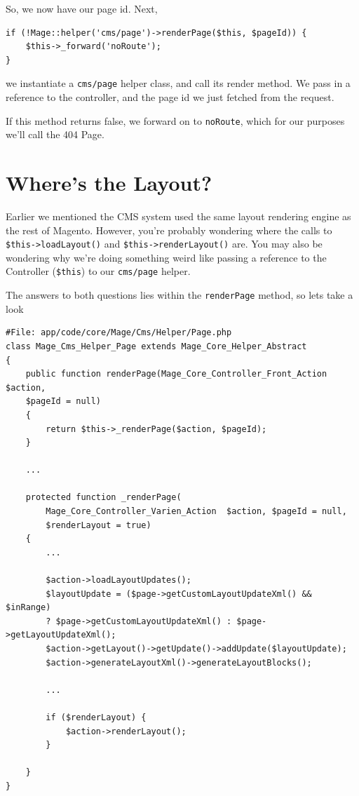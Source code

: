 \documentclass[oneside]{book}
\begin{document}
So, we now have our page id.  Next,

\begin{lstlisting}
if (!Mage::helper('cms/page')->renderPage($this, $pageId)) {
    $this->_forward('noRoute');
}

\end{lstlisting}


we instantiate a \footnotesize\texttt{cms/page} \normalsize  helper class, and call its render method.  We pass in a reference to the controller, and the page id we just fetched from the request.

If this method returns false, we forward on to \footnotesize\texttt{noRoute}\normalsize, which for our purposes we'll call the 404 Page.

\section{Where's the Layout?}

Earlier we mentioned the CMS system used the same layout rendering engine as the rest of Magento.  However, you're probably wondering where the calls to \footnotesize\texttt{\$this-\textgreater loadLayout()} \normalsize  and \footnotesize\texttt{\$this-\textgreater renderLayout()} \normalsize  are.  You may also be wondering why we're doing something weird like passing a reference to the Controller (\footnotesize\texttt{\$this}\normalsize) to our \footnotesize\texttt{cms/page} \normalsize  helper.

The answers to both questions lies within the \footnotesize\texttt{renderPage} \normalsize  method, so lets take a look

\begin{lstlisting}
#File: app/code/core/Mage/Cms/Helper/Page.php
class Mage_Cms_Helper_Page extends Mage_Core_Helper_Abstract
{
    public function renderPage(Mage_Core_Controller_Front_Action $action,
    $pageId = null)
    {
        return $this->_renderPage($action, $pageId);
    }

    ...

    protected function _renderPage(
        Mage_Core_Controller_Varien_Action  $action, $pageId = null,
        $renderLayout = true)
    {
        ...

        $action->loadLayoutUpdates();
        $layoutUpdate = ($page->getCustomLayoutUpdateXml() && $inRange)
        ? $page->getCustomLayoutUpdateXml() : $page->getLayoutUpdateXml();
        $action->getLayout()->getUpdate()->addUpdate($layoutUpdate);
        $action->generateLayoutXml()->generateLayoutBlocks();

        ...

        if ($renderLayout) {
            $action->renderLayout();
        }

    }
}

\end{lstlisting}
\end{document}

